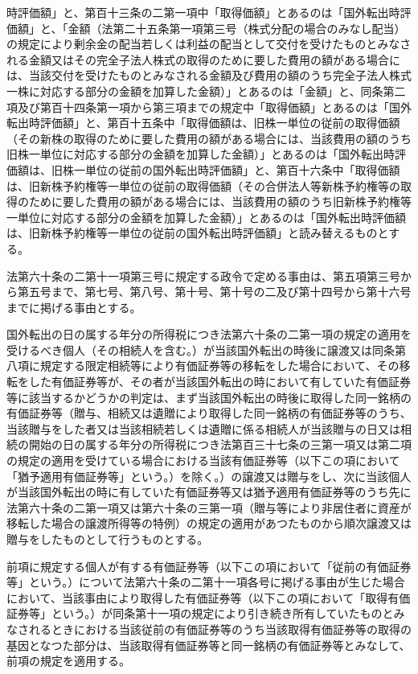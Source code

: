 \documentclass[twocolumn,a4j,10pt]{ltjtarticle}
\begin{document}
\begin{description}
時評価額」と、第百十三条の二第一項中「取得価額」とあるのは「国外転出時評価額」と、「金額（法第二十五条第一項第三号（株式分配の場合のみなし配当）の規定により剰余金の配当若しくは利益の配当として交付を受けたものとみなされる金額又はその完全子法人株式の取得のために要した費用の額がある場合には、当該交付を受けたものとみなされる金額及び費用の額のうち完全子法人株式一株に対応する部分の金額を加算した金額）」とあるのは「金額」と、同条第二項及び第百十四条第一項から第三項までの規定中「取得価額」とあるのは「国外転出時評価額」と、第百十五条中「取得価額は、旧株一単位の従前の取得価額（その新株の取得のために要した費用の額がある場合には、当該費用の額のうち旧株一単位に対応する部分の金額を加算した金額）」とあるのは「国外転出時評価額は、旧株一単位の従前の国外転出時評価額」と、第百十六条中「取得価額は、旧新株予約権等一単位の従前の取得価額（その合併法人等新株予約権等の取得のために要した費用の額がある場合には、当該費用の額のうち旧新株予約権等一単位に対応する部分の金額を加算した金額）」とあるのは「国外転出時評価額は、旧新株予約権等一単位の従前の国外転出時評価額」と読み替えるものとする。
\item[\rensuji{7}]法第六十条の二第十一項第三号に規定する政令で定める事由は、第五項第三号から第五号まで、第七号、第八号、第十号、第十号の二及び第十四号から第十六号までに掲げる事由とする。
\item[\rensuji{8}]国外転出の日の属する年分の所得税につき法第六十条の二第一項の規定の適用を受けるべき個人（その相続人を含む。）が当該国外転出の時後に譲渡又は同条第八項に規定する限定相続等により有価証券等の移転をした場合において、その移転をした有価証券等が、その者が当該国外転出の時において有していた有価証券等に該当するかどうかの判定は、まず当該国外転出の時後に取得した同一銘柄の有価証券等（贈与、相続又は遺贈により取得した同一銘柄の有価証券等のうち、当該贈与をした者又は当該相続若しくは遺贈に係る相続人が当該贈与の日又は相続の開始の日の属する年分の所得税につき法第百三十七条の三第一項又は第二項の規定の適用を受けている場合における当該有価証券等（以下この項において「猶予適用有価証券等」という。）を除く。）の譲渡又は贈与をし、次に当該個人が当該国外転出の時に有していた有価証券等又は猶予適用有価証券等のうち先に法第六十条の二第一項又は第六十条の三第一項（贈与等により非居住者に資産が移転した場合の譲渡所得等の特例）の規定の適用があつたものから順次譲渡又は贈与をしたものとして行うものとする。
\item[\rensuji{9}]前項に規定する個人が有する有価証券等（以下この項において「従前の有価証券等」という。）について法第六十条の二第十一項各号に掲げる事由が生じた場合において、当該事由により取得した有価証券等（以下この項において「取得有価証券等」という。）が同条第十一項の規定により引き続き所有していたものとみなされるときにおける当該従前の有価証券等のうち当該取得有価証券等の取得の基因となつた部分は、当該取得有価証券等と同一銘柄の有価証券等とみなして、前項の規定を適用する。
\end{description}
\end{document}
